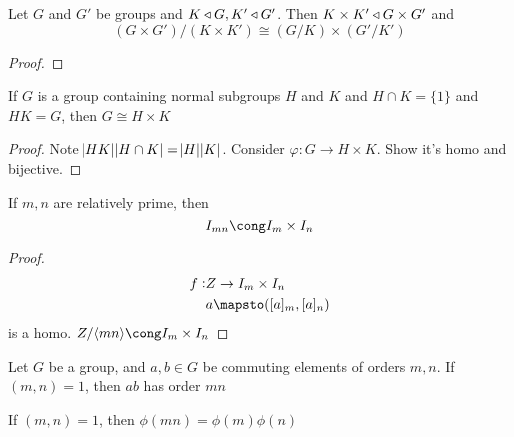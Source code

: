 \documentclass[11pt]{article}
\begin{document}
\begin{proposition}[]
Let \(G\) and \(G'\) be groups and \(K\triangleleft G, K'\triangleleft G'\). Then \(K\times K'\triangleleft
   G\times G'\) and
\begin{equation*}
(G\times G')/(K\times K')\cong (G/K)\times(G'/K')
\end{equation*}
\end{proposition}

\begin{proof}
   
\end{proof}

\begin{proposition}[]
If \(G\) is a group containing normal subgroups \(H\) and \(K\) and \(H\cap K=\{1\}\)
and \(HK=G\), then \(G\cong H\times K\)
\end{proposition}

\begin{proof}
Note \(\abs{HK}\abs{H\cap K}=\abs{H}\abs{K}\). Consider \(\varphi:G\to H\times
   K\). Show it's homo and bijective.
\end{proof}

\begin{theorem}[]
\label{thm2.81}
If \(m,n\) are relatively prime, then
\begin{equation*}
\I_{mn}\cong\I_m\times\I_n
\end{equation*}
\end{theorem}

\begin{proof}
\begin{align*}
f:&\Z\to\I_m\times\I_n\\
&a\mapsto([a]_m,[a]_n)
\end{align*}
is a homo.
\(\Z/\la mn\ra\cong\I_m\times\I_n\)
\end{proof}

\begin{proposition}[]
Let \(G\) be a group, and \(a,b\in G\) be commuting elements of orders \(m,n\). If
\((m,n)=1\), then \(ab\) has order \(mn\)
\end{proposition}

\begin{corollary}[]
If \((m,n)=1\), then \(\phi(mn)=\phi(m)\phi(n)\)
\end{corollary}
\end{document}
